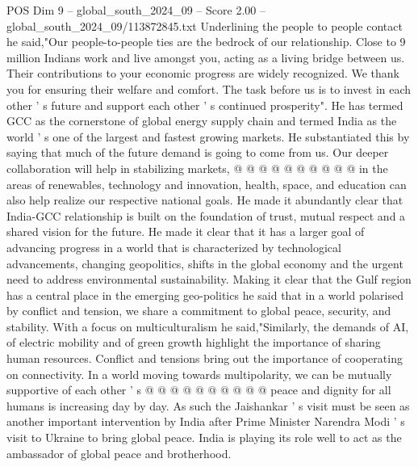 \begin{textsample}{POS Dim 9 – global\_south\_2024\_09 – Score 2.00 – global\_south\_2024\_09/113872845.txt}
Underlining the people to people contact he said,"Our people-to-people ties are the bedrock of our relationship.
Close to 9 million Indians work and live amongst you, acting as a living bridge between us.
Their contributions to your economic progress are widely recognized.
We thank you for ensuring their welfare and comfort.
The task before us is to invest in each other ' s future and support each other ' s continued prosperity".
He has termed GCC as the cornerstone of global energy supply chain and termed India as the world ' s one of the largest and fastest growing markets.
He substantiated this by saying that much of the future demand is going to come from us.
Our deeper collaboration will help in stabilizing markets, @ @ @ @ @ @ @ @ @ @ in the areas of renewables, technology and innovation, health, space, and education can also help realize our respective national goals.
He made it abundantly clear that India-GCC relationship is built on the foundation of trust, mutual respect and a shared vision for the future.
He made it clear that it has a larger goal of advancing progress in a world that is characterized by technological advancements, changing geopolitics, shifts in the global economy and the urgent need to address environmental sustainability.
Making it clear that the Gulf region has a central place in the emerging geo-politics he said that in a world polarised by conflict and tension, we share a commitment to global peace, security, and stability.
With a focus on multiculturalism he said,"Similarly, the demands of AI, of electric mobility and of green growth highlight the importance of sharing human resources.
Conflict and tensions bring out the importance of cooperating on connectivity.
In a world moving towards multipolarity, we can be mutually supportive of each other ' s @ @ @ @ @ @ @ @ @ @ peace and dignity for all humans is increasing day by day.
As such the Jaishankar ' s visit must be seen as another important intervention by India after Prime Minister Narendra Modi ' s visit to Ukraine to bring global peace.
India is playing its role well to act as the ambassador of global peace and brotherhood.

\end{textsample}

